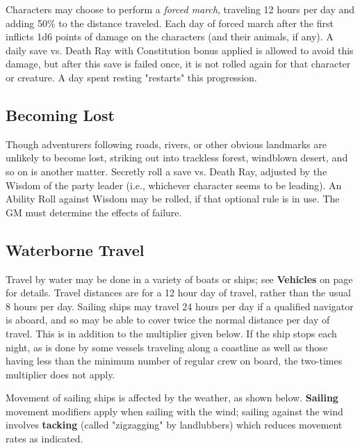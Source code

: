 \documentclass[a4paper,twoside,openany,10pt]{book}
\begin{document}
\begin{multicols}{2}
Characters may choose to perform a \emph{forced march}, traveling 12 hours per day and adding 50\% to the distance traveled. Each day of forced march after the first inflicts 1d6 points of damage on the characters (and their animals, if any). A daily save vs. Death Ray with Constitution bonus applied is allowed to avoid this damage, but after this save is failed once, it is not rolled again for that character or creature. A day spent resting "restarts" this progression.

\subsection{Becoming Lost}\label{becoming-lost}

Though adventurers following roads, rivers, or other obvious landmarks are unlikely to become lost, striking out into trackless forest, windblown desert, and so on is another matter. Secretly roll a save vs. Death Ray, adjusted by the Wisdom of the party leader (i.e., whichever character seems to be leading). An Ability Roll against Wisdom may be rolled, if that optional rule is in use. The GM must determine the effects of failure.

\subsection{Waterborne Travel}\label{waterborne-travel}

Travel by water may be done in a variety of boats or ships; see \textbf{Vehicles} on page \hyperlink{vehicles}{\pageref{vehicles}} for details. Travel distances are for a 12 hour day of travel, rather than the usual 8 hours per day. Sailing ships may travel 24 hours per day if a qualified navigator is aboard, and so may be able to cover twice the normal distance per day of travel. This is in addition to the multiplier given below. If the ship stops each night, as is done by some vessels traveling along a coastline as well as those having less than the minimum number of regular crew on board, the two-times multiplier does not apply.

Movement of sailing ships is affected by the weather, as shown below. \textbf{Sailing} movement modifiers apply when sailing with the wind; sailing against the wind involves \textbf{tacking} (called "zigzagging" by landlubbers) which reduces movement rates as indicated. \\


\end{multicols}
\end{document}

